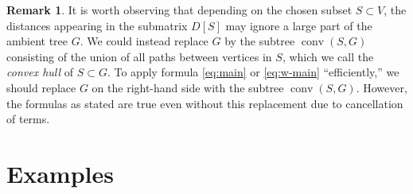 \documentclass{amsart}
\theoremstyle{definition}
\newtheorem{rmk}[thm]{Remark}
\DeclareMathOperator{\conv}{conv}
\begin{document}
\begin{rmk}
It is worth observing that depending on the chosen subset $S \subset V$, the distances appearing in the submatrix $D[S]$ may ignore a large part of the ambient tree $G$.
We could instead replace $G$ by the subtree  $\conv(S,G)$ consisting of the union of all paths between vertices in $S$,
which we call the {\em convex hull} of $S \subset G$.
To apply formula \eqref{eq:main} or \eqref{eq:w-main} ``efficiently,''
we should replace $G$ on the right-hand side with the subtree $\conv(S,G)$.
However, the formulas as stated are true even without this replacement due to cancellation of terms.
\end{rmk}



\section{Examples}
\end{document}
